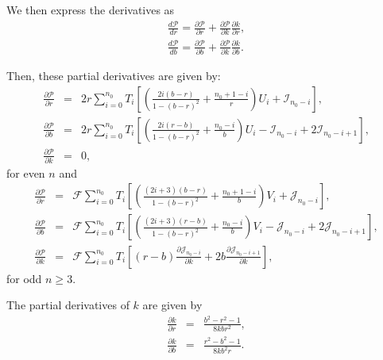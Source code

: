 \documentclass[modern]{aastex61}
\begin{document}
We then express the derivatives as
\begin{eqnarray}
\frac{d \mathcal{P}}{d r} = \frac{\partial \mathcal{P}}{\partial r}  +  \frac{\partial \mathcal{P}}{\partial k} \frac{\partial k}{\partial r},\\
\frac{d \mathcal{P}}{d b} = \frac{\partial \mathcal{P}}{\partial b}  +  \frac{\partial \mathcal{P}}{\partial k} \frac{\partial k}{\partial b}.
\end{eqnarray}

Then, these partial derivatives are given by:
\begin{eqnarray}
\frac{\partial \mathcal{P}}{\partial r}  &=& 2r\sum_{i=0}^{n_0} T_i  \left[\left(\frac{2i(b-r)}{1-(b-r)^2} + \frac{n_0+1-i}{r}\right) U_i + \mathcal{I}_{n_0-i}\right],\\
\frac{\partial \mathcal{P}}{\partial b}  &=& 2r\sum_{i=0}^{n_0} T_i  \left[\left(\frac{2i(r-b)}{1-(b-r)^2} + \frac{n_0-i}{b}\right) U_i - \mathcal{I}_{n_0-i} + 2\mathcal{I}_{n_0-i+1}\right],\\
\frac{\partial \mathcal{P}}{\partial k}  &=& 0,
\end{eqnarray}
for even $n$ and
\begin{eqnarray}
\frac{\partial \mathcal{P}}{\partial r}  &=& \mathcal{F}\sum_{i=0}^{n_0} T_i \left[\left(\frac{(2i+3)(b-r)}{1-(b-r)^2} + \frac{n_0+1-i}{b}\right) V_i + \mathcal{J}_{n_0-i}\right],\\
\frac{\partial \mathcal{P}}{\partial b}  &=& \mathcal{F}\sum_{i=0}^{n_0} T_i \left[\left(\frac{(2i+3)(r-b)}{1-(b-r)^2} + \frac{n_0-i}{b}\right) V_i - \mathcal{J}_{n_0-i} + 2\mathcal{J}_{n_0-i+1}\right],\\
\frac{\partial \mathcal{P}}{\partial k}  &=& \mathcal{F}\sum_{i=0}^{n_0} T_i \left[(r-b) \frac{\partial\mathcal{J}_{n_0-i}}{\partial k} + 2b \frac{\partial \mathcal{J}_{n_0-i+1}}{\partial k}\right],
\end{eqnarray}
for odd $n \ge 3$.

The partial derivatives of $k$ are given by
\begin{eqnarray}
\frac{\partial k}{\partial r} &=& \frac{b^2-r^2-1}{8 k b r^2},\\
\frac{\partial k}{\partial b} &=& \frac{r^2-b^2-1}{8 k b^2 r}.
\end{eqnarray}
\end{document}
